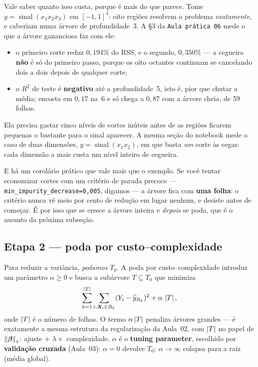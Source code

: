 \documentclass[11pt,a4paper]{article}
\begin{document}
\begin{observacao}\label{obs:miopia}
Vale saber quanto isso custa, porque é mais do que parece. Tome
$y=\operatorname{sinal}(x_1x_2x_3)$ em $[-1,1]^3$: oito regiões resolvem o problema
\emph{exatamente}, e caberiam numa árvore de profundidade~3. A §3 da \texttt{Aula
prática 06} mede o que a árvore gananciosa faz com ele:

\begin{itemize}[leftmargin=1.2cm,nosep]
  \item o primeiro corte reduz $0{,}194\%$ do RSS, e o segundo, $0{,}350\%$ --- a
        cegueira \textbf{não} é só do primeiro passo, porque os oito octantes
        continuam se cancelando dois a dois depois de qualquer corte;
  \item o $R^2$ de teste é \textbf{negativo} até a profundidade~5, isto é, pior que
        chutar a média; encosta em $0{,}17$ na~6 e só chega a $0{,}87$ com a árvore
        cheia, de 59 folhas.
\end{itemize}

Ela precisa gastar cinco níveis de cortes inúteis antes de as regiões ficarem
pequenas o bastante para o sinal aparecer. A mesma seção do notebook mede o caso de
duas dimensões, $y=\operatorname{sinal}(x_1x_2)$, em que basta \emph{um} corte às
cegas: cada dimensão a mais custa um nível inteiro de cegueira.

E há um corolário prático que vale mais que o exemplo. Se você tentar economizar
cortes com um critério de parada precoce --- \texttt{min\_impurity\_decrease=0,005},
digamos --- a árvore fica com \textbf{uma folha}: o critério nunca vê meio por cento
de redução em lugar nenhum, e desiste antes de começar. É por isso que se cresce a
árvore inteira e \emph{depois} se poda, que é o assunto da próxima subseção.
\end{observacao}

\subsection{Etapa 2 --- poda por custo--complexidade}
Para reduzir a variância, \emph{podamos} $T_0$. A poda por custo--complexidade
introduz um parâmetro $\alpha\ge 0$ e busca a subárvore $T\subseteq T_0$ que
minimiza
\begin{equation}\label{eq:poda}
  \sum_{k=1}^{\left\lvert T \right\rvert}\sum_{i:\bm{X}_i\in R_k}(Y_i-\widehat y_{R_k})^2
   + \alpha\,\left\lvert T \right\rvert,
\end{equation}
onde $\left\lvert T \right\rvert$ é o número de folhas. O termo $\alpha\left\lvert T \right\rvert$ penaliza árvores
grandes --- é exatamente a mesma estrutura da regularização da Aula~02, com
$\left\lvert T \right\rvert$ no papel de $\left\lVert \bm{\beta} \right\rVert_1$: ajuste $+$ $\lambda\times$ complexidade.
$\alpha$ é o \textbf{tuning parameter}, escolhido por \textbf{validação cruzada}
(Aula~03): $\alpha=0$ devolve $T_0$; $\alpha\to\infty$ colapsa para a raiz
(média global).
\end{document}

